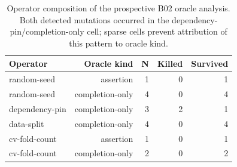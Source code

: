 \begin{table}[t]
\centering
\caption{Operator composition of the prospective B02 oracle analysis. Both detected mutations occurred in the dependency-pin/completion-only cell; sparse cells prevent attribution of this pattern to oracle kind.}
\label{tab:rq2-operator-oracle}
\begin{tabular}{lrrrr}
\toprule
Operator & Oracle kind & N & Killed & Survived \\
\midrule
random-seed & assertion & 1 & 0 & 1 \\
random-seed & completion-only & 4 & 0 & 4 \\
dependency-pin & completion-only & 3 & 2 & 1 \\
data-split & completion-only & 4 & 0 & 4 \\
cv-fold-count & assertion & 1 & 0 & 1 \\
cv-fold-count & completion-only & 2 & 0 & 2 \\
\bottomrule
\end{tabular}
\end{table}
